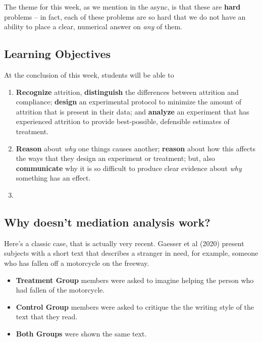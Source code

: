 \documentclass[
]{article}
\providecommand{\tightlist}{%
  \setlength{\itemsep}{0pt}\setlength{\parskip}{0pt}}
\begin{document}
The theme for this week, as we mention in the async, is that these are \textbf{hard} problems -- in fact, each of these problems are so hard that we do not have an ability to place a clear, numerical answer on \emph{any} of them.

\hypertarget{learning-objectives-11}{%
\subsection{Learning Objectives}\label{learning-objectives-11}}

At the conclusion of this week, students will be able to

\begin{enumerate}
\def\labelenumi{\arabic{enumi}.}
\tightlist
\item
  \textbf{Recognize} attrition, \textbf{distinguish} the differences between attrition and compliance; \textbf{design} an experimental protocol to minimize the amount of attrition that is present in their data; and \textbf{analyze} an experiment that has experienced attrition to provide best-possible, defensible estimates of treatment.
\item
  \textbf{Reason} about \emph{why} one things causes another; \textbf{reason} about how this affects the ways that they design an experiment or treatment; but, also \textbf{communicate} why it is so difficult to produce clear evidence about \emph{why} something has an effect.
\item
\end{enumerate}

\hypertarget{why-doesnt-mediation-analysis-work}{%
\subsection{Why doesn't mediation analysis work?}\label{why-doesnt-mediation-analysis-work}}

Here's a classic case, that is actually very recent. Gaesser et al (2020) present subjects with a short text that describes a stranger in need, for example, someone who has fallen off a motorcycle on the freeway.

\begin{itemize}
\tightlist
\item
  \textbf{Treatment Group} members were asked to imagine helping the person who had fallen of the motorcycle.
\item
  \textbf{Control Group} members were asked to critique the the writing style of the text that they read.
\item
  \textbf{Both Groups} were shown the same text.
\end{itemize}
\end{document}
